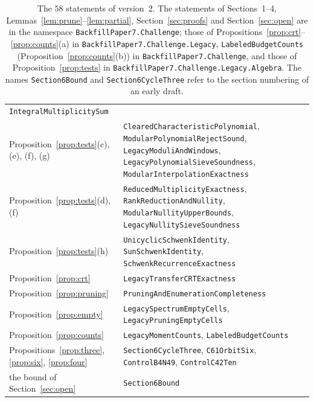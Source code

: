 \documentclass[11pt]{article}
\theoremstyle{definition}
\theoremstyle{remark}
\begin{document}
\begin{table}[ht]
\begin{tabular}{@{}>{\raggedright\arraybackslash}p{}
 >{\raggedright\arraybackslash}p{}@{}}
 \texttt{IntegralMultiplicitySum}\\
Proposition~\ref{prop:tests}(c), (e), (f), (g) &
 \texttt{ClearedCharacteristicPolynomial},
 \texttt{ModularPolynomialRejectSound}, \texttt{LegacyModuliAndWindows},
 \texttt{LegacyPolynomialSieveSoundness},
 \texttt{ModularInterpolationExactness}\\
Proposition~\ref{prop:tests}(d), (f) &
 \texttt{ReducedMultiplicityExactness}, \texttt{RankReductionAndNullity},
 \texttt{ModularNullityUpperBounds}, \texttt{LegacyNullitySieveSoundness}\\
Proposition~\ref{prop:tests}(h) & \texttt{UnicyclicSchwenkIdentity},
 \texttt{SunSchwenkIdentity}, \texttt{SchwenkRecurrenceExactness}\\
Proposition~\ref{prop:crt} & \texttt{LegacyTransferCRTExactness}\\
Proposition~\ref{prop:pruning} & \texttt{PruningAndEnumerationCompleteness}\\
Proposition~\ref{prop:empty} & \texttt{LegacySpectrumEmptyCells},
 \texttt{LegacyPruningEmptyCells}\\
Proposition~\ref{prop:counts} & \texttt{LegacyMomentCounts},
 \texttt{LabeledBudgetCounts}\\
Propositions~\ref{prop:three}, \ref{prop:six}, \ref{prop:four} &
 \texttt{Section6CycleThree}, \texttt{C61OrbitSix}, \texttt{ControlB4N49},
 \texttt{ControlC42Ten}\\
the bound of Section~\ref{sec:open} & \texttt{Section6Bound}\\
\bottomrule
\end{tabular}
\caption{The $58$ statements of version~2. The statements of Sections~1--4,
Lemmas~\ref{lem:prune}--\ref{lem:partial}, Section~\ref{sec:proofs} and
Section~\ref{sec:open} are in the namespace \texttt{BackfillPaper7.Challenge};
those of Propositions~\ref{prop:crt}--\ref{prop:counts}(a) in
\texttt{BackfillPaper7.Challenge.Legacy}, \texttt{LabeledBudgetCounts}
(Proposition~\ref{prop:counts}(b)) in \texttt{BackfillPaper7.Challenge}, and those of
Proposition~\ref{prop:tests} in \texttt{BackfillPaper7.Challenge.Legacy.Algebra}.
The names \texttt{Section6Bound} and \texttt{Section6CycleThree} refer to the
section numbering of an early draft.}\label{tab:lean}
\end{table}
\end{document}

